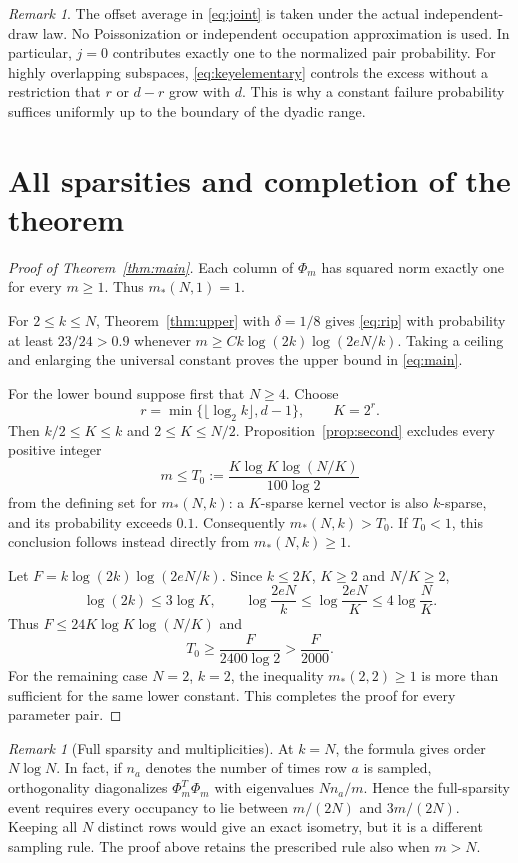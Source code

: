 \documentclass[11pt]{article}
\theoremstyle{remark}
\newtheorem{remark}[theorem]{Remark}
\newcommand{\1}{\mathbf 1}
\begin{document}
\begin{remark}
The offset average in \eqref{eq:joint} is taken under the actual
independent-draw law. No Poissonization or independent occupation
approximation is used. In particular, $j=0$ contributes exactly one to
the normalized pair probability. For highly overlapping subspaces,
\eqref{eq:keyelementary} controls the excess without a restriction that
$r$ or $d-r$ grow with $d$. This is why a constant failure probability
suffices uniformly up to the boundary of the dyadic range.
\end{remark}

\section{All sparsities and completion of the theorem}

\begin{proof}[Proof of Theorem~\ref{thm:main}]
Each column of $\Phi_m$ has squared norm exactly one for every $m\geq1$.
Thus $m_*(N,1)=1$.

For $2\leq k\leq N$, Theorem~\ref{thm:upper} with $\delta=1/8$ gives
\eqref{eq:rip} with probability at least $23/24>0.9$ whenever
$m\geq Ck\log(2k)\log(2eN/k)$. Taking a ceiling and enlarging the
universal constant proves the upper bound in \eqref{eq:main}.

For the lower bound suppose first that $N\geq4$. Choose
\[
 r=\min\{\lfloor\log_2 k\rfloor,d-1\},\qquad K=2^r.
\]
Then $k/2\leq K\leq k$ and $2\leq K\leq N/2$. Proposition~\ref{prop:second}
excludes every positive integer
\[
 m\leq T_0:=\frac{K\log K\log(N/K)}{100\log2}
\]
from the defining set for $m_*(N,k)$: a $K$-sparse kernel vector is also
$k$-sparse, and its probability exceeds $0.1$. Consequently
$m_*(N,k)>T_0$. If $T_0<1$, this conclusion follows instead directly
from $m_*(N,k)\geq1$.

Let $F=k\log(2k)\log(2eN/k)$. Since $k\leq2K$, $K\geq2$ and
$N/K\geq2$,
\[
 \log(2k)\leq3\log K,\qquad
 \log\frac{2eN}{k}\leq\log\frac{2eN}{K}\leq4\log\frac NK.
\]
Thus $F\leq24K\log K\log(N/K)$ and
\[
 T_0\geq\frac F{2400\log2}>\frac F{2000}.
\]
For the remaining case $N=2$, $k=2$, the inequality $m_*(2,2)\geq1$
is more than sufficient for the same lower constant. This completes
the proof for every parameter pair.
\end{proof}

\begin{remark}[Full sparsity and multiplicities]
At $k=N$, the formula gives order $N\log N$. In fact, if $n_a$ denotes
the number of times row $a$ is sampled, orthogonality diagonalizes
$\Phi_m^T\Phi_m$ with eigenvalues $Nn_a/m$. Hence the full-sparsity
event requires every occupancy to lie between $m/(2N)$ and $3m/(2N)$.
Keeping all $N$ distinct rows would give an exact isometry, but it is a
different sampling rule. The proof above retains the prescribed rule
also when $m>N$.
\end{remark}
\end{document}
